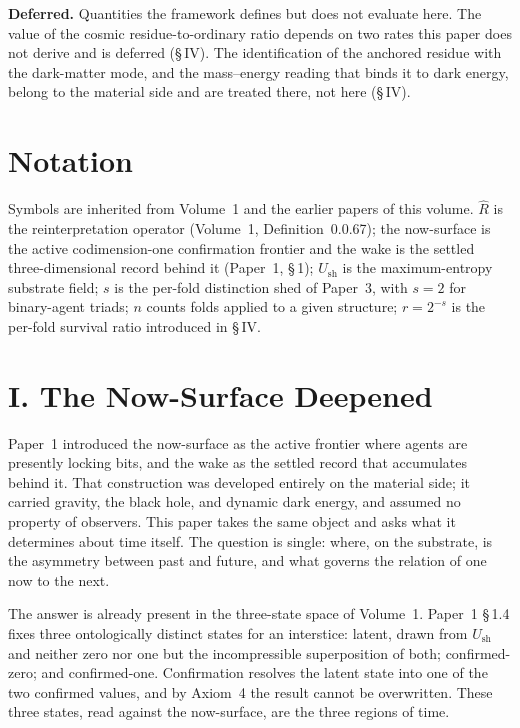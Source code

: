 \documentclass[11pt,oneside]{report}
\theoremstyle{definition}
\theoremstyle{remark}
\begin{document}
\textbf{Deferred.} Quantities the framework defines but does not evaluate
here. The value of the cosmic residue-to-ordinary ratio depends on two
rates this paper does not derive and is deferred (\S\,IV). The
identification of the anchored residue with the dark-matter mode, and the
mass--energy reading that binds it to dark energy, belong to the material
side and are treated there, not here (\S\,IV).

\section*{Notation}

Symbols are inherited from Volume~1 and the earlier papers of this
volume. \ensuremath{\hat{R}} is the reinterpretation operator (Volume~1,
Definition~0.0.67); the now-surface is the active codimension-one
confirmation frontier and the wake is the settled three-dimensional
record behind it (Paper~1, \S\,1); \ensuremath{U_{\mathrm{sh}}} is the
maximum-entropy substrate field; \ensuremath{s} is the per-fold
distinction shed of Paper~3, with \ensuremath{s = 2} for binary-agent
triads; \ensuremath{n} counts folds applied to a given structure;
\ensuremath{r = 2^{-s}} is the per-fold survival ratio introduced in
\S\,IV.

\section*{I. The Now-Surface Deepened}

Paper~1 introduced the now-surface as the active frontier where agents
are presently locking bits, and the wake as the settled record that
accumulates behind it. That construction was developed entirely on the
material side; it carried gravity, the black hole, and dynamic dark
energy, and assumed no property of observers. This paper takes the same
object and asks what it determines about time itself. The question is
single: where, on the substrate, is the asymmetry between past and
future, and what governs the relation of one now to the next.

The answer is already present in the three-state space of Volume~1.
Paper~1 \S\,1.4 fixes three ontologically distinct states for an
interstice: latent, drawn from \ensuremath{U_{\mathrm{sh}}} and neither
zero nor one but the incompressible superposition of both;
confirmed-zero; and confirmed-one. Confirmation resolves the latent state
into one of the two confirmed values, and by Axiom~4 the result cannot be
overwritten. These three states, read against the now-surface, are the
three regions of time.
\end{document}

